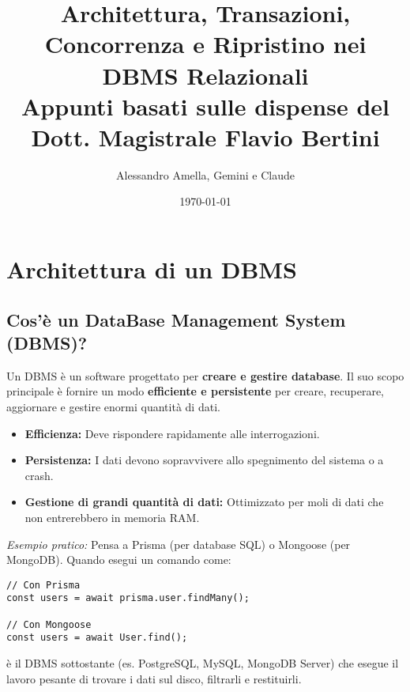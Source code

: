 

\usepackage{hyperref}

\title{Architettura, Transazioni, Concorrenza e Ripristino nei DBMS Relazionali\\
  \large Appunti basati sulle dispense del Dott. Magistrale Flavio Bertini}
\author{Alessandro Amella, Gemini e Claude}
\date{\today}



\maketitle
\tableofcontents
\newpage

\section{Architettura di un DBMS}

\subsection{Cos'è un DataBase Management System (DBMS)?}
Un DBMS è un software progettato per \textbf{creare e gestire database}. Il suo scopo principale è fornire un modo \textbf{efficiente e persistente} per creare, recuperare, aggiornare e gestire enormi quantità di dati.
\begin{itemize}
    \item \textbf{Efficienza:} Deve rispondere rapidamente alle interrogazioni.
    \item \textbf{Persistenza:} I dati devono sopravvivere allo spegnimento del sistema o a crash.
    \item \textbf{Gestione di grandi quantità di dati:} Ottimizzato per moli di dati che non entrerebbero in memoria RAM.
\end{itemize}

\textit{Esempio pratico:} Pensa a Prisma (per database SQL) o Mongoose (per MongoDB). Quando esegui un comando come:
\begin{verbatim}
// Con Prisma
const users = await prisma.user.findMany();

// Con Mongoose
const users = await User.find();
\end{verbatim}
è il DBMS sottostante (es. PostgreSQL, MySQL, MongoDB Server) che esegue il lavoro pesante di trovare i dati sul disco, filtrarli e restituirli.

